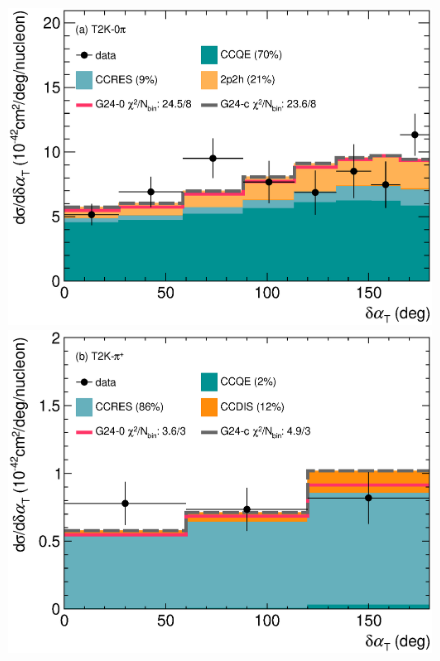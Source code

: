 

\begin{figure} 
    \centering 		
    \includegraphics[width=\dbfigwid\textwidth]{figures/tuning/0026-t2k_0pi_dalphat_reac_decomp_covfix.eps}
    \includegraphics[width=\dbfigwid\textwidth]{figures/tuning/0026-t2k_pip_dalphat_reac_decomp_covfix.eps}

\end{figure}

